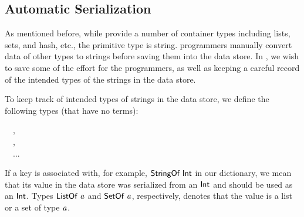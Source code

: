 \subsection{Automatic Serialization}
\label{sec:polymorphic-redis}

As mentioned before, while \Redis{} provide a number of container types
including lists, sets, and hash, etc., the primitive type is string. \Hedis{}
programmers manually convert data of other types to strings before saving them
into the data store. In \Edis{}, we wish to save some of the effort for the
programmers, as well as keeping a careful record of the intended types of the
strings in the data store.

To keep track of intended types of strings in the data store, we define the
following types (that have no terms):
\begin{hscode}\SaveRestoreHook
{}%
%
%
\>[B]{}\;\<[16]%
\>[16]{}\mathbin{::}\mathbin{*}\to \mathbin{*}~~,{}\<[E]%
\\
\>[B]{}\;\<[16]%
\>[16]{}\mathbin{::}\mathbin{*}\to \mathbin{*}~~,{}\<[E]%
\\
\>[B]{}\;\<[16]%
\>[16]{}\mathbin{::}\mathbin{*}\to \mathbin{*}~~...{}\<[E]%
\ColumnHook
\end{hscode}\resethooks
If a key is associated with, for example, \ensuremath{\Conid{StringOf}\;\Conid{Int}} in our dictionary, we
mean that its value in the data store was serialized from an \ensuremath{\Conid{Int}} and should be
used as an \ensuremath{\Conid{Int}}. Types \ensuremath{\Conid{ListOf}\;\Varid{a}} and \ensuremath{\Conid{SetOf}\;\Varid{a}}, respectively, denotes that the
value is a list or a set of type \ensuremath{\Varid{a}}.

